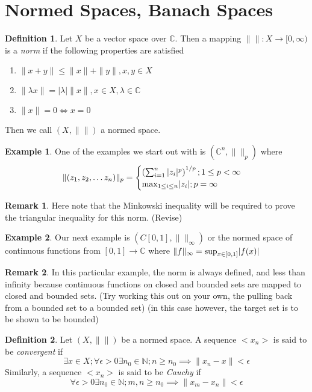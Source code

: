 \documentclass[12pt]{book}
\theoremstyle{definition}
\newtheorem*{defn}{Definition}
\newtheorem{eg}{Example}[chapter]
\newtheorem*{rem}{Remark}
\begin{document}
\section{Normed Spaces, Banach Spaces}
\begin{defn}
    Let $X$ be a vector space over $\mathbb{C}$. Then a mapping $\|\|: X \to [0, \infty)$ is a \textit{norm} if the following properties are satisfied
    \begin{enumerate}
        \item $\|x+y\| \leq \|x\| + \|y\|, x, y \in X$
        \item $\|\lambda x\| = |\lambda|\|x\|, x \in X, \lambda \in \mathbb{C}$
        \item $\|x\| = 0 \iff x = 0$
    \end{enumerate}
    Then we call $(X, \|\|)$ a normed space.
\end{defn}
\begin{eg}
    One of the examples we start out with is $(\mathbb{C}^n, \|\|_p)$ where 
    $$\|(z_1, z_2, \ldots z_n)\|_p = \begin{cases}
        \left(\sum_{i = 1}^n |z_i|^p\right)^{1/p}; 1 \leq p < \infty\\
        \textnormal{max}_{1 \leq i \leq n} |z_i| ; p = \infty
    \end{cases}$$
\end{eg}
\begin{rem}
    Here note that the Minkowski inequality will be required to prove the triangular inequality for this norm. (Revise)
\end{rem}
\begin{eg}
    Our next example is $(\mathit{C}[0, 1], \|\|_{\infty})$ or the normed space of continuous functions from $[0, 1] \to \mathbb{C}$ where $\|f\|_{\infty} = \textnormal{sup}_{x \in [0, 1]} |f(x)|$
\end{eg}
\begin{rem}
    In this particular example, the norm is always defined, and less than infinity because continuous functions on closed and bounded sets are mapped to closed and bounded sets. (Try working this out on your own, the pulling back from a bounded set to a bounded set) (in this case however, the target set is to be shown to be bounded)
\end{rem}
\begin{defn}
    Let $(X, \|\|)$ be a normed space. A sequence $<x_n>$ is said to be \textit{convergent} if $$\exists x \in X; \forall \epsilon > 0 \exists n_0 \in \mathbb{N}; n \geq n_0 \implies \| x_n - x \| < \epsilon$$
    Similarly, a sequence $<x_n>$ is said to be \textit{Cauchy} if $$\forall \epsilon > 0 \exists n_0 \in \mathbb{N}; m, n \geq n_0 \implies \| x_m - x_n \| < \epsilon$$
\end{defn}
\end{document}
